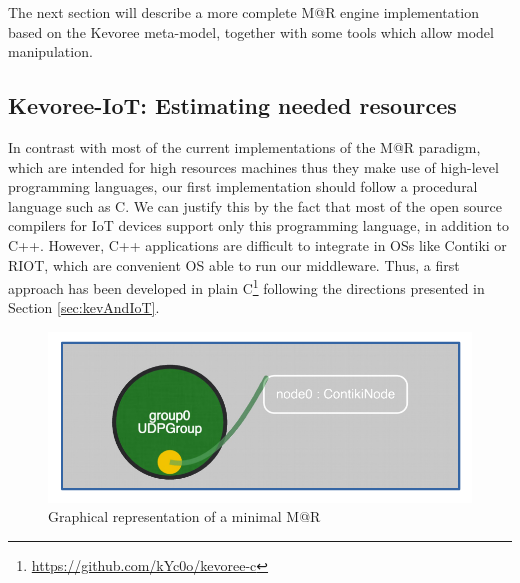 The next section will describe a more complete M@R engine implementation based on the Kevoree meta-model, together with some tools which allow model manipulation.

\subsection{Kevoree-IoT: Estimating needed resources}
\label{subsec:MARImpl}
In contrast with most of the current implementations of the M@R paradigm, which are intended for high resources machines thus they make use of high-level programming languages, our first implementation should follow a procedural language such as C.
We can justify this by the fact that most of the open source compilers for IoT devices support only this programming language, in addition to C++.
However, C++ applications are difficult to integrate in OSs like Contiki or RIOT, which are convenient OS able to run our middleware.
Thus, a first approach has been developed in plain C\footnote{\url{https://github.com/kYc0o/kevoree-c}} following the directions presented in Section \ref{sec:kevAndIoT}.


\begin{figure}[]
	\centering
	\includegraphics[width=0.55\columnwidth]{chapters/intra-node.images/MAR_example.pdf}
	\caption{Graphical representation of a minimal M@R}
	\label{fig:1stModelC}
\end{figure}

